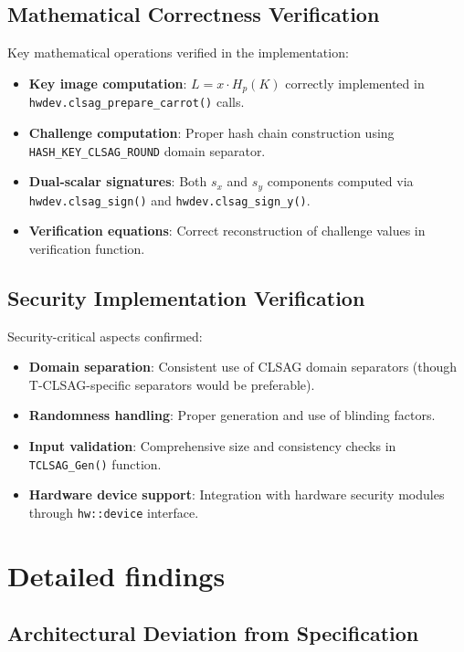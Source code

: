 \documentclass{article}
\begin{document}
\subsection{Mathematical Correctness Verification}
Key mathematical operations verified in the implementation:
\begin{itemize}
  \item \textbf{Key image computation}: $L = x \cdot H_p(K)$ correctly implemented 
        in \texttt{hwdev.clsag\_prepare\_carrot()} calls.
  \item \textbf{Challenge computation}: Proper hash chain construction using 
        \texttt{HASH\_KEY\_CLSAG\_ROUND} domain separator.
  \item \textbf{Dual-scalar signatures}: Both $s_x$ and $s_y$ components computed 
        via \texttt{hwdev.clsag\_sign()} and \texttt{hwdev.clsag\_sign\_y()}.
  \item \textbf{Verification equations}: Correct reconstruction of challenge values 
        in verification function.
\end{itemize}

\subsection{Security Implementation Verification}
Security-critical aspects confirmed:
\begin{itemize}
  \item \textbf{Domain separation}: Consistent use of CLSAG domain separators 
        (though T-CLSAG-specific separators would be preferable).
  \item \textbf{Randomness handling}: Proper generation and use of blinding factors.
  \item \textbf{Input validation}: Comprehensive size and consistency checks in 
        \texttt{TCLSAG\_Gen()} function.
  \item \textbf{Hardware device support}: Integration with hardware security modules 
        through \texttt{hw::device} interface.
\end{itemize}

\section{Detailed findings}

\subsection{Architectural Deviation from Specification}
\end{document}
